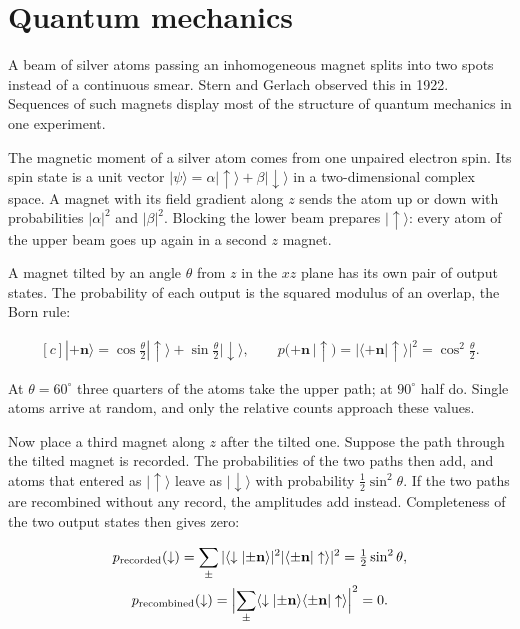 \documentclass[11pt,oneside]{book}
\newenvironment{centeredalign}{\[\begin{gathered}[c]}{\end{gathered}\]}
\begin{document}
\clearpage

\section{Quantum mechanics}

\label{topic:quantum-mechanics}

A beam of silver atoms passing an inhomogeneous magnet splits into two spots instead of a continuous smear. Stern and Gerlach observed this in 1922. Sequences of such magnets display most of the structure of quantum mechanics in one experiment.

The magnetic moment of a silver atom comes from one unpaired electron spin. Its spin state is a unit vector \(|\psi\rangle=\alpha|\uparrow\rangle+\beta|\downarrow\rangle\) in a two-dimensional complex space. A magnet with its field gradient along \(z\) sends the atom up or down with probabilities \(|\alpha|^2\) and \(|\beta|^2\). Blocking the lower beam prepares \(|\uparrow\rangle\): every atom of the upper beam goes up again in a second \(z\) magnet.

A magnet tilted by an angle \(\theta\) from \(z\) in the \(xz\) plane has its own pair of output states. The probability of each output is the squared modulus of an overlap, the Born rule:

\begin{centeredalign}
|{+}\mathbf n\rangle=\cos\tfrac\theta2|\uparrow\rangle+\sin\tfrac\theta2|\downarrow\rangle,\qquad
p({+}\mathbf n\,|\uparrow)=|\langle{+}\mathbf n|\uparrow\rangle|^2=\cos^2\tfrac\theta2.
\end{centeredalign}

At \(\theta=60^\circ\) three quarters of the atoms take the upper path; at \(90^\circ\) half do. Single atoms arrive at random, and only the relative counts approach these values.

Now place a third magnet along \(z\) after the tilted one. Suppose the path through the tilted magnet is recorded. The probabilities of the two paths then add, and atoms that entered as \(|\uparrow\rangle\) leave as \(|\downarrow\rangle\) with probability \(\tfrac12\sin^2\theta\). If the two paths are recombined without any record, the amplitudes add instead. Completeness of the two output states then gives zero:

\begin{centeredalign}
p_{\rm recorded}(\downarrow)=\sum_\pm|\langle\downarrow|{\pm}\mathbf n\rangle|^2|\langle{\pm}\mathbf n|\uparrow\rangle|^2
=\tfrac12\sin^2\theta,\\
p_{\rm recombined}(\downarrow)=\Bigl|\sum_\pm\langle\downarrow|{\pm}\mathbf n\rangle\langle{\pm}\mathbf n|\uparrow\rangle\Bigr|^2=0.
\end{centeredalign}
\end{document}
